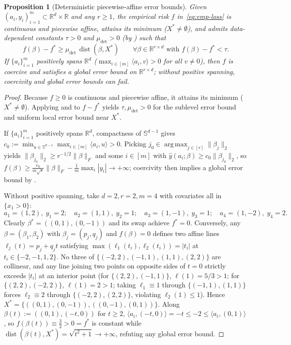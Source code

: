 \documentclass[11pt]{article}
\theoremstyle{plain}
\newtheorem{proposition}[theorem]{Proposition}
\theoremstyle{remark}
\numberwithin{equation}{section}
\newcommand{\R}{\mathbb{R}}
\newcommand{\Sph}{\mathbb{S}}
\newcommand{\ip}[2]{\langle #1, #2 \rangle}
\newcommand{\norm}[1]{\|#1\|}
\newcommand{\dist}{\operatorname{dist}}
\newcommand{\argmax}{\operatorname*{arg\,max}}
\newcommand{\Fnorm}[1]{\|#1\|_F}
\begin{document}
\begin{proposition}[Deterministic piecewise-affine error bounds]
  \label{prop:deterministic-eb}
  Given $(a_i, y_i)_{i=1}^m \subset \R^d \times \R$ and any $r \ge 1$, the empirical risk $f$ in~\eqref{eq:emp-loss} is continuous and piecewise affine, attains its minimum ($X^* \ne \emptyset$), and admits data-dependent constants $\tau > 0$ and $\mu_{\mathrm{det}} > 0$ (by \cite{robinson1981some,dolgopolik2023nonlocal}) such that
  \[
    f(\beta) - f^* \ge \mu_{\mathrm{det}}\,\dist(\beta, X^*)
    \qquad \forall \beta \in \R^{r\times d} \text{ with } f(\beta) - f^* < \tau.
  \]
  If $\{a_i\}_{i=1}^m$ positively spans $\R^d$ ($\max_{i \in [m]} \ip{a_i}{v} > 0$ for all $v \ne 0$), then $f$ is coercive and satisfies a global error bound on $\R^{r \times d}$; without positive spanning, coercivity and global error bounds can fail.
\end{proposition}
\begin{proof}
Because $f \ge 0$ is continuous and piecewise affine, it attains its minimum ($X^* \ne \emptyset$). Applying \cite[Proposition~1]{robinson1981some} and \cite[Theorem~4 and Proposition~1]{dolgopolik2023nonlocal} to $f - f^*$ yields $\tau, \mu_{\mathrm{det}} > 0$ for the sublevel error bound and uniform local error bound near $X^*$.

If $\{a_i\}_{i=1}^m$ positively spans $\R^d$, compactness of $\Sph^{d-1}$ gives $c_0 := \min_{u \in \Sph^{d-1}} \max_{i \in [m]} \ip{a_i}{u} > 0$. Picking $j_0 \in \argmax_{j \in [r]} \norm{\beta_j}_2$ yields $\norm{\beta_{j_0}}_2 \ge r^{-1/2}\Fnorm{\beta}$ and some $i \in [m]$ with $\hat y(a_i; \beta) \ge c_0 \norm{\beta_{j_0}}_2$, so $f(\beta) \ge \frac{c_0}{m\sqrt{r}}\Fnorm{\beta} - \frac{1}{m}\max_i |y_i| \to +\infty$; coercivity then implies a global error bound by \cite[Corollary~2]{dolgopolik2023nonlocal}.

Without positive spanning, take $d = 2, r = 2, m = 4$ with covariates all in $\{x_1 > 0\}$:
\[
  a_1 = (1, 2),\; y_1 = 2; \quad a_2 = (1, 1),\; y_2 = 1; \quad a_3 = (1, -1),\; y_3 = 1; \quad a_4 = (1, -2),\; y_4 = 2.
\]
Clearly $\beta^* = ((0, 1), (0, -1))$ and its swap achieve $f^* = 0$. Conversely, any $\beta = (\beta_1, \beta_2)$ with $\beta_j = (p_j, q_j)$ and $f(\beta) = 0$ defines two affine lines $\ell_j(t) = p_j + q_j t$ satisfying $\max(\ell_1(t_i), \ell_2(t_i)) = |t_i|$ at $t_i \in \{-2, -1, 1, 2\}$. No three of $\{(-2,2), (-1,1), (1,1), (2,2)\}$ are collinear, and any line joining two points on opposite sides of $t = 0$ strictly exceeds $|t_i|$ at an interior point (for $\{(2,2),(-1,1)\}$, $\ell(1) = 5/3 > 1$; for $\{(2,2),(-2,2)\}$, $\ell(1) = 2 > 1$; taking $\ell_1 \equiv 1$ through $\{(-1,1),(1,1)\}$ forces $\ell_2 \equiv 2$ through $\{(-2,2),(2,2)\}$, violating $\ell_2(1) \le 1$). Hence $X^* = \{((0,1),(0,-1)), ((0,-1),(0,1))\}$. Along $\beta(t) := ((0, 1), (-t, 0))$ for $t \ge 2$, $\ip{a_i}{(-t,0)} = -t \le -2 \le \ip{a_i}{(0,1)}$, so $f(\beta(t)) \equiv \frac{3}{2} > 0 = f^*$ is constant while $\dist(\beta(t), X^*) = \sqrt{t^2 + 1} \to +\infty$, refuting any global error bound.
\end{proof}
\end{document}
